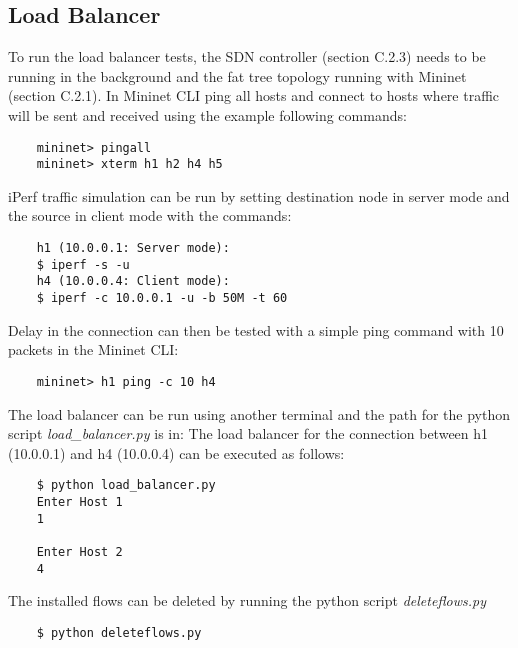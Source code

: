 \begin{appendices}
\subsection{Load Balancer}
To run the load balancer tests, the SDN controller (section C.2.3) needs to be running in the background and the fat tree topology running with Mininet (section C.2.1). In Mininet CLI ping all hosts and connect to hosts where traffic will be sent and received using the example following commands:
\begin{verbatim}
	mininet> pingall
	mininet> xterm h1 h2 h4 h5
\end{verbatim}
iPerf traffic simulation can be run by setting destination node in server mode and the source in client mode with the commands:
\begin{verbatim}
	h1 (10.0.0.1: Server mode):
	$ iperf -s -u
	h4 (10.0.0.4: Client mode):
	$ iperf -c 10.0.0.1 -u -b 50M -t 60
\end{verbatim}
Delay in the connection can then be tested with a simple ping command with 10 packets in the Mininet CLI:
\begin{verbatim}
	mininet> h1 ping -c 10 h4
\end{verbatim}
The load balancer can be run using another terminal and the path for the python script \textit{load\_balancer.py} is in:
The load balancer for the connection between h1 (10.0.0.1) and h4 (10.0.0.4) can be executed as follows:
\begin{verbatim}
	$ python load_balancer.py 
	Enter Host 1
	1

	Enter Host 2
	4
\end{verbatim}
The installed flows can be deleted by running the python script \textit{deleteflows.py}
\begin{verbatim}
	$ python deleteflows.py
\end{verbatim}
\end{appendices}